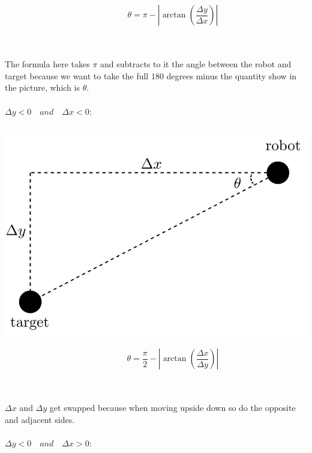 \begin{minipage}{0.5\textwidth}\raggedleft
$$\quad \quad \quad \quad \theta = \pi - \left| \arctan\left(\frac{\Delta y}{\Delta x}\right) \right|$$ \\
\end{minipage}
\noindent
\\
The formula here takes $\pi$ and subtracts to it the angle between the robot and target because we want to take the full $180$ degrees minus the quantity show in the picture, which is $\theta$.
\\
\\
\textbf{$\Delta y < 0 \quad and \quad \Delta x < 0$}: \\ \\
\begin{minipage}{0.4\textwidth}
\includegraphics[width=\linewidth]{images/theta3.jpg}
\end{minipage}
\begin{minipage}{0.5\textwidth}\raggedleft
$$\quad \quad \quad \quad \theta = \frac{\pi}{2} -  \left| \arctan\left(\frac{\Delta x}{\Delta y}\right) \right|$$ \\
\end{minipage}
\noindent
\\
$\Delta x$ and $\Delta y$ get swapped because when moving upside down so do the opposite and adjacent sides.
\\
\\
\textbf{$\Delta y < 0 \quad and \quad \Delta x > 0$}: \\ \\
